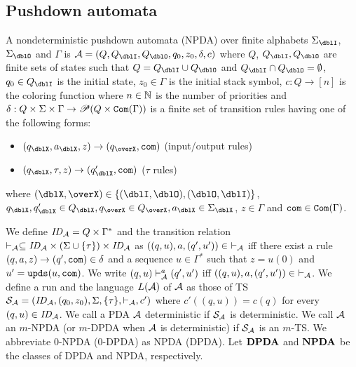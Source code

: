 \subsection{Pushdown automata}

\begin{definition}
A nondeterministic {pushdown automata} (NPDA) over finite alphabets $\Sigma_\dblI$, $\Sigma_\dblO$ and $\Gamma$ is $\calA = (Q, Q_\dblI, Q_\dblO, q_0, z_0, \delta, c)$ where
$Q$, $Q_\dblI, Q_\dblO$ are finite sets of states such that $Q=Q_\dblI\cup Q_\dblO$ and $Q_\dblI \cap Q_\dblO = \emptyset$,
$q_0\in Q_\dblI$ is the initial state,
$z_0\in \Gamma$ is the initial stack symbol,
$c: Q \to [n]$ is the coloring function where $n\in \mathbb{N}$ is the number of priorities and
$\delta: Q \times \Sigma \times \Gamma \to \mathscr{P}(Q \times \mathtt{Com}(\Gamma))$ is a finite set of transition rules having one of the following forms:
\begin{itemize}
\item $(q_\dblX, a_\dblX, z) \rightarrow (q_\overX, \com)$ (input/output rules)
\item $(q_\dblX, \tau, z)\to(q'_\dblX,\com)$ ($\tau$ rules)
\end{itemize}
where $(\dblX, \overX)\in\{(\dblI, \dblO), (\dblO,\dblI)\}$,
$q_\dblX, q'_\dblX\in Q_\dblX, q_\overX\in Q_\overX, a_\dblX\in \Sigma_\dblX$, $z\in \Gamma$ and $\mathtt{com}\in \mathtt{Com}(\Gamma)$.
\end{definition}
We define $\mathit{ID}_{\cal A}= Q\times \Gamma^*$ and
the transition relation $\vdash_{\cal A}\subseteq \mathit{ID}_{\cal A}\times (\Sigma\cup\{\tau\})\times \mathit{ID}_{\cal A}$ as
$((q,u),a,(q',u'))\in\ \vdash_{\cal A}$ iff there exist a rule $(q, a, z) \rightarrow (q', \mathtt{com}) \in \delta$ and a sequence $u\in \Gamma^*$ such that $z=u(0)$ and $u'=\mathtt{upds}(u,\mathtt{com})$.
We write $(q,u)\vdash^a_{\cal A}(q',u')$ iff
$((q,u),a,(q',u'))\in\ \vdash_{\cal A}$.
We define a run and the language $L({\cal A})$ of ${\cal A}$ as those of TS ${\cal S}_{\cal A}=(\mathit{ID}_{\cal A}, (q_0,z_0),\Sigma, \{\tau\},\vdash_{\cal A},c')$
where $c'((q,u))= c(q)$ for every $(q,u)\in\mathit{ID}_{\cal A}$.
We call a PDA ${\cal A}$ deterministic if ${\cal S}_{\cal A}$ is deterministic.
We call ${\cal A}$ an $m$-NPDA (or $m$-DPDA when ${\cal A}$ is deterministic)
if ${\cal S}_{\cal A}$ is an $m$-TS.
We abbreviate $0$-NPDA ($0$-DPDA) as NPDA (DPDA).
Let ${\bf DPDA}$ and ${\bf NPDA}$ be the classes of DPDA and NPDA, respectively.

